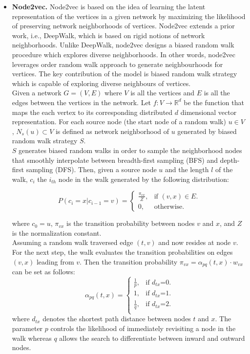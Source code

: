 \begin{itemize}
\item \textbf{Node2vec.}
Node2vec is based on the idea of learning the latent representation of the vertices in a given network by maximizing the likelihood of preserving network neighborhoods of vertices. Node2vec extends a prior work, i.e., DeepWalk, which is based on rigid notions of network neighborhoods. Unlike DeepWalk, node2vec designs a biased random walk procedure which explores diverse neighborhoods.  In other words, node2vec leverages  order random walk approach to generate neighbourhoods for vertices. The key contribution of the model is biased random walk strategy which is capable of exploring diverse neighbours of vertices.\\  
Given a network $G = (V, E)$ where $V$ is all the vertices and $E$ is all the edges between the vertices in the network. Let $f : V \to \mathbb{R}^d$ be the function that maps the each vertex to its corresponding distributed $d$ dimensional vector representation. For each source node (the start node of a random walk) $u\in V$ , $N_s(u) \subset V$ is defined as network neighborhood of $u$ generated by biased random walk strategy $S$.\\
$S$ generates biased random walks in order to sample the neighborhood nodes that smoothly interpolate between breadth-first sampling (BFS) and depth-first sampling (DFS). 
Then, given a source node $u$ and the length $l$ of the walk, $c_i$ the $i_{th}$ node in the walk generated by the following distribution:


\begin{equation}
    P(c_i = x| c_{i-1}=v )= \begin{cases}
    \frac{\pi_{vx} }{Z}, & \text{if $(v,x)\in E$}.\\
    0, & \text{otherwise}.
  \end{cases}
\end{equation}

where $c_0 =u$, $\pi_{vx}$ is the transition probability between nodes $v$ and $x$, and $Z$ is the normalization constant. \\
Assuming a random walk traversed edge $(t, v)$ and now resides at node $v$. For the next step, the walk evaluates the transition probabilities on edges $(v,x)$ leading from $v$. Then the transition probability $\pi_{vx}=\alpha_{pq}(t,x)\cdot w_{vx}$ can be set as follows:
\begin{equation}
    \alpha_{pq}(t,x)= \begin{cases}
    \frac{1}{p}, & \text{if $d_{tx}$=0}.\\
    1, & \text{if $d_{tx}$=1}.\\
    \frac{1}{q}, & \text{if $d_{tx}$=2}.\\
  \end{cases}
\end{equation}
where $d_{tx}$ denotes the shortest path distance between nodes $t$ and $x$. The parameter $p$ controls the likelihood of immediately revisiting a node in the walk whereas $q$ allows the search to differentiate between inward and outward nodes.%


\end{itemize}

